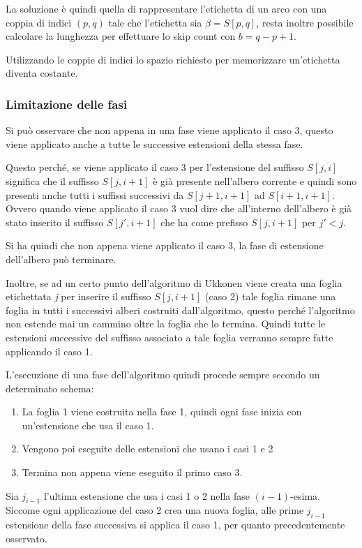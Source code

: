La soluzione è quindi quella di rappresentare l'etichetta di un arco con una coppia di indici $(p,q)$ tale che l'etichetta sia $\beta = S[p,q]$, resta inoltre possibile calcolare la lunghezza per effettuare lo skip count con $b = q -p+1$.

Utilizzando le coppie di indici lo spazio richiesto per memorizzare un'etichetta diventa costante.

\subsubsection{Limitazione delle fasi}

Si può osservare che non appena in una fase viene applicato il caso 3, questo viene applicato anche a tutte le successive estensioni della stessa fase.

Questo perché, se viene applicato il caso 3 per l'estensione del suffisso $S[j,i]$ significa che il suffisso $S[j,i+1]$ è già presente nell'albero corrente e quindi sono presenti anche tutti i suffissi successivi da $S[j+1,i+1]$ ad $S[i+1,i+1]$.
Ovvero quando viene applicato il caso 3 vuol dire che all'interno dell'albero è già stato inserito il suffisso $S[j',i+1]$ che ha come prefisso $S[j,i+1]$ per $j' < j$.

Si ha quindi che non appena viene applicato il caso 3, la fase di estensione dell'albero può terminare.

Inoltre, se ad un certo punto dell'algoritmo di Ukkonen viene creata una foglia etichettata \textit{j} per inserire il suffisso $S[j,i+1]$ (caso 2) tale foglia rimane una foglia in tutti i successivi alberi costruiti dall'algoritmo, questo perché l'algoritmo non estende mai un cammino oltre la foglia che lo termina. Quindi tutte le estensioni successive del suffisso associato a tale foglia verranno sempre fatte applicando il caso 1.

L'esecuzione di una fase dell'algoritmo quindi procede sempre secondo un determinato schema:

\begin{enumerate}
	\item La foglia 1 viene costruita nella fase 1, quindi ogni fase inizia con un'estensione che usa il caso 1.
	\item Vengono poi eseguite delle estensioni che usano i casi 1 e 2
	\item Termina non appena viene eseguito il primo caso 3.
\end{enumerate}

Sia $j_{i-1}$ l'ultima estensione che usa i casi 1 o 2 nella fase $(i-1)$-esima. Siccome ogni applicazione del caso 2 crea una nuova foglia, alle prime $j_{i-1}$ estensione della fase successiva si applica il caso 1, per quanto precedentemente osservato.

